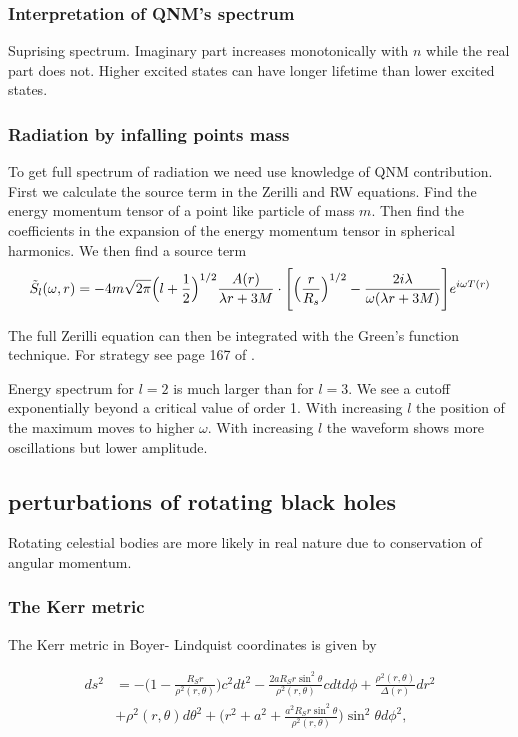 \documentclass[12 pt]{article}
\begin{document}
	\subsubsection{Interpretation of QNM's spectrum}
	Suprising spectrum. Imaginary part increases monotonically with $n$ while the real part does not. Higher excited states can have longer lifetime than lower excited states. 
	
	\subsubsection{Radiation by infalling points mass}
	
	To get full spectrum of radiation we need use knowledge of QNM contribution. First we calculate the source term in the Zerilli and RW equations.  Find the energy momentum tensor of a point like particle of mass $m$. Then find the coefficients in the expansion of the energy momentum tensor in spherical harmonics. We then find a source term
	\begin{equation}
		\Tilde{S}_l(\omega,r) = -4m\sqrt{2 \pi} \Big(l + \frac{1}{2}\Big)^{1/2} \frac{A(r)}{\lambda r + 3M} \cdot \Bigg[\Big(\frac{r}{R_s}\Big)^{1/2} - \frac{2i \lambda}{\omega (\lambda r + 3M)} \Bigg]e^{i \omega T(r)}
	\end{equation}
	
	The full Zerilli equation can then be integrated with the Green's function technique. For strategy see page 167 of \cite{maggiore}. 
	
	Energy spectrum for $l=2$ is much larger than for $l=3$. We see a cutoff exponentially beyond a critical value of order 1. With increasing $l$ the position of the maximum moves to higher $\omega$. With increasing $l$ the waveform shows more oscillations but lower amplitude. 
	
	\subsection{perturbations of rotating black holes}
	Rotating celestial bodies are more likely in real nature due to conservation of angular momentum. 
	
	\subsubsection{The Kerr metric}
	
	The Kerr metric in Boyer- Lindquist coordinates is given by
	
	\begin{align*}
		ds^2 &= -\Big(1- \frac{R_S r}{\rho^2(r,\theta)} \Big) c^2 dt^2 - \frac{2 a R_S r \sin^2 \theta}{\rho^2(r,\theta)} c dt d\phi + \frac{\rho^2(r,\theta)}{\Delta(r)} dr^2 \\
		&+ \rho^2(r,\theta)d\theta^2 + \Big(r^2 + a^2 + \frac{a^2 R_S r \sin^2 \theta}{\rho^2(r,\theta)} \Big) \sin^2 \theta d\phi^2 ,
	\end{align*}
	
\end{document}

